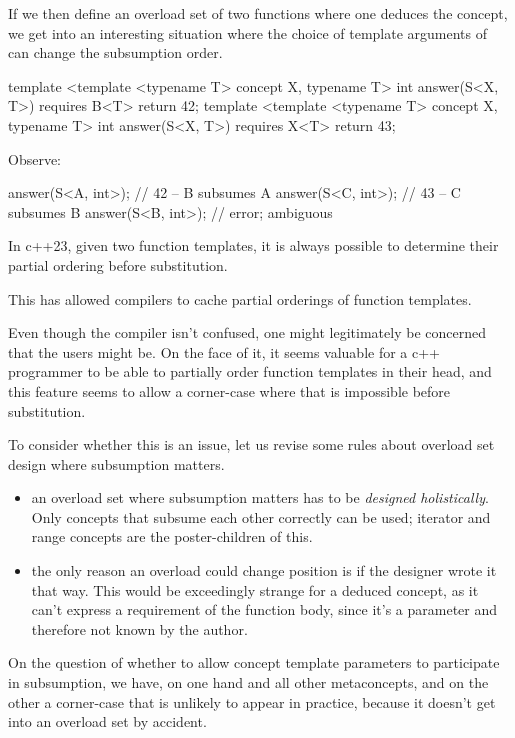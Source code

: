 \documentclass{wg21}
\begin{document}
If we then define an overload set of two functions where one deduces the concept,
we get into an interesting situation where the choice of template arguments of  can change the subsumption order.

\begin{colorblock}
template <template <typename T>  concept X, typename T>
int answer(S<X, T>) requires B<T> { return 42; }
template <template <typename T> concept X, typename T>
int answer(S<X, T>) requires X<T> { return 43; }
\end{colorblock}

Observe:

\begin{colorblock}
answer(S<A, int>{}); // 42 -- B subsumes A
answer(S<C, int>{}); // 43 -- C subsumes B
answer(S<B, int>{}); // error; ambiguous
\end{colorblock}

In c++23, given two function templates, it is always possible to determine their partial ordering before substitution.

This has allowed compilers to cache partial orderings of function templates.

Even though the compiler isn't confused, one might legitimately be concerned that the users might be.
On the face of it, it seems valuable for a c++ programmer to be able to partially order function templates in their head,
and this feature seems to allow a corner-case where that is impossible before substitution.

To consider whether this is an issue, let us revise some rules about overload set design where subsumption matters.

\begin{itemize}
  \item an overload set where subsumption matters has to be \textit{designed holistically}.
    Only concepts that subsume each other correctly can be used;
    iterator and range concepts are the poster-children of this.
  \item the only reason an overload could change position is if the designer wrote it that way.
    This would be exceedingly strange for a deduced concept, as it can't express a requirement of the function body,
    since it's a parameter and therefore not known by the author.
\end{itemize}

On the question of whether to allow concept template parameters to participate in subsumption, we have,
on one hand  and all other metaconcepts,
and on the other a corner-case that is unlikely to appear in practice, because it doesn't get into an overload set by accident.
\end{document}
